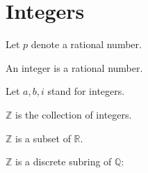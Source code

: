 \documentclass{article}
\begin{document}
\section{Integers}

\begin{forthel}
Let $p$ denote a rational number.

\begin{signature}
An integer is a rational number.
\end{signature}
Let $a,b,i$ stand for integers.

\begin{definition}
$\mathbb{Z}$ is the collection of integers.
\end{definition}


\begin{theorem}
$\mathbb{Z}$ is a subset of $\mathbb{R}$.
\end{theorem}

\end{forthel}


$\mathbb{Z}$ is a discrete subring of $\mathbb{Q}$:
\end{document}
